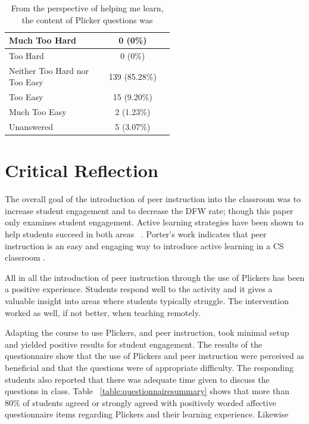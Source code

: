 \documentclass[12pt]{article}
\begin{document}
\begin{table}[ht]
\caption{From the perspective of helping me learn, the content of Plicker questions was}
\begin{tabular}{p{0.55\linewidth}|c} %
 \rowcolor{LightGray} 
 Much Too Hard & 0 (0\%)\\\midrule 
 Too Hard & 0 (0\%)\\\midrule 
 \rowcolor{LightGray}
 Neither Too Hard nor Too Easy & 139 (85.28\%)\\\midrule 
 Too Easy & 15 (9.20\%)\\\midrule 
 \rowcolor{LightGray}
 Much Too Easy & 2 (1.23\%)\\\midrule 
 Unanswered & 5 (3.07\%)\\\bottomrule 
\end{tabular}
\label{table:questionDifficulty}
\end{table}

\section{Critical Reflection}

The overall goal of the introduction of peer instruction into the classroom was to increase student engagement and to decrease the DFW rate; though this paper only examines student engagement.  Active learning strategies have been shown to help students succeed in both areas ~\cite{freemanActiveLearningIncreases2014}.  Porter’s work indicates that peer instruction is an easy and engaging way to introduce active learning in a CS classroom \cite{porterPeerInstructionStudents2011}.

All in all the introduction of peer instruction through the use of Plickers has been a positive experience. Students respond well to the activity and it gives a valuable insight into areas where students typically struggle. The intervention worked as well, if not better, when teaching remotely. 

Adapting the course to use Plickers, and peer instruction, took minimal setup and yielded positive results for student engagement. The results of the questionnaire show that the use of Plickers and peer instruction were perceived as beneficial and that the questions were of appropriate difficulty. The responding students also reported that there was adequate time given to discuss the questions in class. Table ~\ref{table:questionnairesummary} shows that more than 80\% of students agreed or strongly agreed with positively worded affective questionnaire items regarding Plickers and their learning experience. Likewise 
\end{document}
